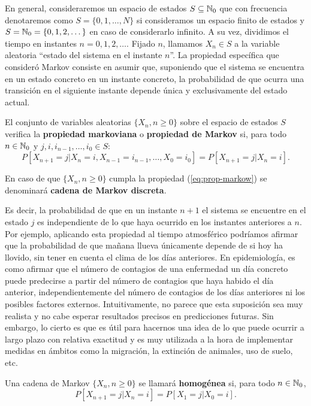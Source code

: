 En general, consideraremos un espacio de estados $S\subseteq \mathbb{N}_0$ que con frecuencia denotaremos como $S=\{0,1,\dots,N\}$ si consideramos un espacio finito de estados y $S=\mathbb{N}_0=\{0,1,2,\dots\}$ en caso de considerarlo infinito. A su vez, dividimos el tiempo en instantes $n=0,1,2,\dots$. Fijado $n$, llamamos $X_n\in S$ a la variable aleatoria ``estado del sistema en el instante $n$''. La propiedad específica que consideró Markov consiste en asumir que, suponiendo que el sistema se encuentra en un estado concreto en un instante concreto, la probabilidad de que ocurra una transición en el siguiente instante depende única y exclusivamente del estado actual.

\begin{definicion}
    El conjunto de variables aleatorias $\{X_n,n\geq 0\}$ sobre el espacio de estados $S$ verifica la \textbf{propiedad markoviana} o \textbf{propiedad de Markov} si, para todo $n\in\mathbb{N}_0$ y $j,i,i_{n-1},\dots, i_0 \in S$:
    \begin{equation}
        \label{eq:prop-markow}
        P[X_{n+1}=j | X_n=i, X_{n-1}=i_{n-1}, \dots, X_0=i_0 ] = P[X_{n+1}=j | X_n=i].
    \end{equation}

    En caso de que $\{X_n,n\geq 0\}$ cumpla la propiedad (\ref{eq:prop-markow}) se denominará \textbf{cadena de Markov discreta}.
\end{definicion}

Es decir, la probabilidad de que en un instante $n+1$ el sistema se encuentre en el estado $j$ es independiente de lo que haya ocurrido en los instantes anteriores a $n$. Por ejemplo, aplicando esta propiedad al tiempo atmosférico podríamos afirmar que la probabilidad de que mañana llueva únicamente depende de si hoy ha llovido, sin tener en cuenta el clima de los días anteriores. En epidemiología, es como afirmar que el número de contagios de una enfermedad un día concreto puede predecirse a partir del número de contagios que haya habido el día anterior, independientemente del número de contagios de los días anteriores ni los posibles factores externos. Intuitivamente, no parece que esta suposición sea muy realista y no cabe esperar resultados precisos en predicciones futuras. Sin embargo, lo cierto es que es útil para hacernos una idea de lo que puede ocurrir a largo plazo con relativa exactitud y es muy utilizada a la hora de implementar medidas en ámbitos como la migración, la extinción de animales, uso de suelo, etc.

\begin{definicion}
    Una cadena de Markov $\{X_n, n\geq 0\}$ se llamará \textbf{homogénea} si, para todo $n\in\mathbb{N}_0$,
    \begin{equation}
        \label{eq:cad-homogenea}
        P[X_{n+1}=j|X_n=i] = P[X_1=j|X_0=i].
    \end{equation}
\end{definicion}

